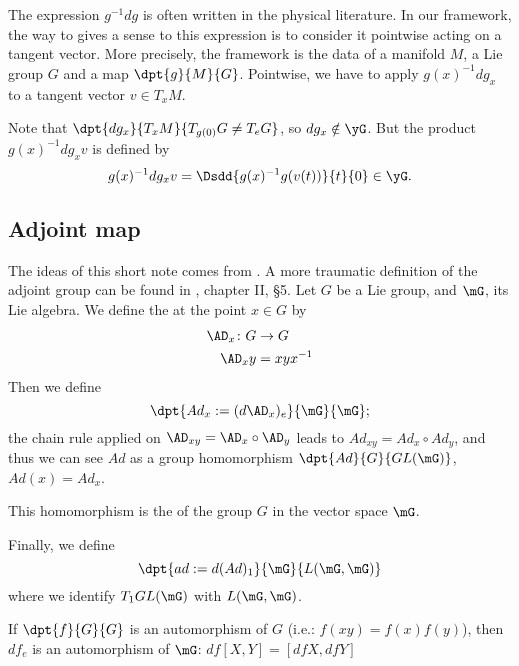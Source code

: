 The expression $g^{-1} dg$ is often written in the physical literature. In our framework, the way to gives a sense to this expression is to consider it pointwise acting on a tangent vector. More precisely, the framework is the data of a manifold $M$, a Lie group $G$ and a map $\dpt{g}{M}{G}$. Pointwise, we have to apply $g(x)^{-1} dg_x$ to a tangent vector $v\in T_xM$.

Note that $\dpt{dg_x}{T_xM}{T_{g(0)}G\neq T_eG}$, so $dg_x\notin \yG$. But the product $g(x)^{-1} dg_x v$ is defined by
\begin{equation}
	g(x)^{-1} dg_x v=\Dsdd{ g(x)^{-1} g(v(t)) }{t}{0}\in\yG.
\end{equation}


\subsection{Adjoint map}

The ideas of this short note comes from \cite{Lie}. A more traumatic definition of the adjoint group can be found in \cite{Helgason}, chapter II, \S 5. Let $G$ be a Lie group, and $\mG$, its Lie algebra. We define the  at the point $x\in G$ by 
\begin{equation}
\begin{aligned}
 \AD_x\colon G&\to G \\ 
 \AD_xy&=xyx^{-1} 
\end{aligned}
\end{equation}
Then we define 
\[
\dpt{Ad_x:=(d\AD_x)_e}{\mG}{\mG};
\]
the chain rule applied on $\AD_{xy}=\AD_x\circ\AD_y$ leads to $Ad_{xy}=Ad_x\circ Ad_y$, and thus we can see $Ad$ as a group homomorphism $\dpt{Ad}{G}{GL(\mG)}$, $Ad(x)=Ad_x$.

\begin{definition}
This homomorphism is the  of the group $G$ in the vector space $\mG$.
\end{definition}


Finally, we define
\[
 \dpt{ad:=d(Ad)_1}{\mG}{L(\mG,\mG)}
\]
 where we identify $T_1GL(\mG)$ with $L(\mG,\mG)$.

\begin{lemma}
If $\dpt{f}{G}{G}$ is an automorphism of $G$ (i.e.: $f(xy)=f(x)f(y)$), then $df_e$ is an automorphism of $\mG$: $df[X,Y]=[df X,dfY]$
\label{lem:auto_1}
\end{lemma}

